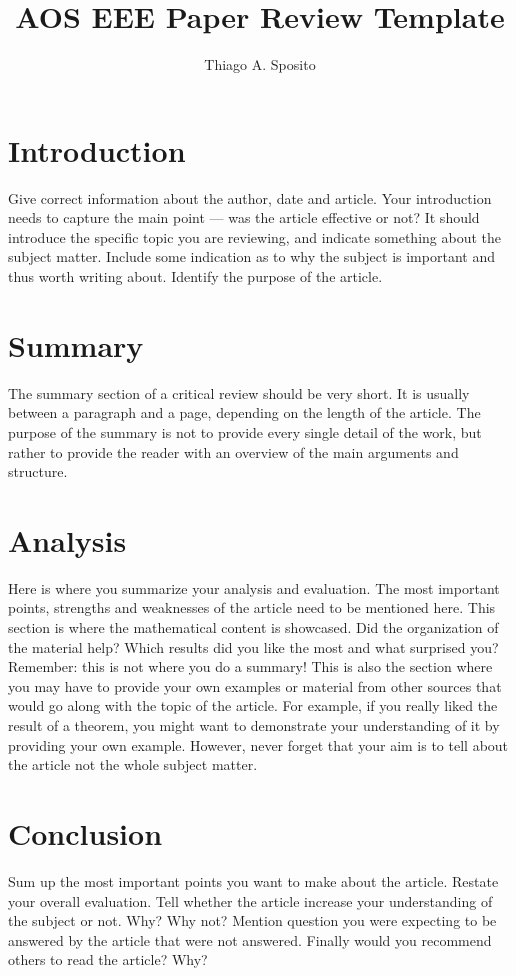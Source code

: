 \documentclass[12pt]{article}
\title{AOS EEE Paper Review Template}
\author{Thiago A. Sposito\inst{1} }
\begin{document}
 

\maketitle


\section{Introduction}

Give correct \cite{smith:99} information about the author, date and article. Your introduction needs to capture the main point --- was the article effective or not? It should introduce the specific topic you are reviewing, and indicate something about the subject matter. Include some indication as to why the subject is important and thus worth writing about. Identify the purpose of the article.


\section{Summary} 

The summary section of a critical review should be very short. It is usually between a paragraph and a page, depending on the length of the article. The purpose of the summary is not to provide every single detail of the work, but rather to provide the reader with an overview of the main arguments and structure.


\section{Analysis}

Here is where you summarize your analysis and evaluation. The most important points, strengths and weaknesses of the article need to be mentioned here. This section is where the mathematical content is showcased. Did the organization of the material help? Which results did you like the most and what surprised you? Remember: this is not where you do a summary! This is also the section where you may have to provide your own examples or material from other sources that would go along with the topic of the article. For example, if you really liked the result of a theorem, you might want to demonstrate your understanding of it by providing your own example. However, never forget that your aim is to tell about the article not the whole subject matter.


\section{Conclusion}

Sum up the most important points you want to make about the article. Restate your overall evaluation. Tell whether the article increase your understanding of the subject or not. Why? Why not? Mention question you were expecting to be answered by the article that were not answered. Finally would you recommend others to read the article? Why?




\end{document}
